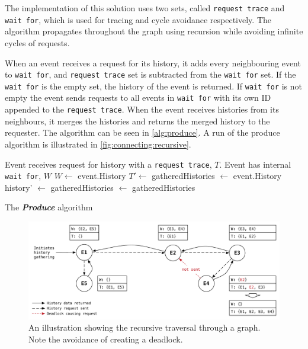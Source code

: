 	\newpar The implementation of this solution uses two sets, called \texttt{request trace} and \texttt{wait for}, which is used for tracing and cycle avoidance respectively. The algorithm propagates throughout the graph using recursion while avoiding infinite cycles of requests. 
	
	When an event receives a request for its history, it adds every neighbouring event to \texttt{wait for}, and \texttt{request trace} set is subtracted from the \texttt{wait for} set. If the \texttt{wait for} is the empty set, the history of the event is returned. If \texttt{wait for} is not empty the event sends requests to all events in \texttt{wait for} with its own ID appended to the \texttt{request trace}. When the event receives histories from its neighbours, it merges the histories and returns the merged history to the requester. The algorithm can be seen in \autoref{alg:produce}. A run of the produce algorithm is illustrated in \autoref{fig:connecting:recursive}.
	
	\begin{algorithm}
		\begin{algorithmic}
			\State Event receives request for history with a \texttt{request trace}, $T$.
			\State Event has internal \texttt{wait for}, $W$
			\State
				\State $W\gets$ 
					\Return event.History
				\Else
					\State $T'\gets$
					\State
					\State gatheredHistories $\leftarrow$ event.History
						\State history' $\leftarrow$ 
						\State gatheredHistories $\leftarrow$ 
					\EndFor
					\State\Return gatheredHistories
				\EndIf
			\EndFunction
		\end{algorithmic}
		\caption{The \textit{\textbf{Produce}} algorithm}
		\label{alg:produce}
	\end{algorithm}
		
	\begin{figure}[H]
		\centering
		\includegraphics[width=\textwidth]{4connect/images/recursive.pdf}
		\caption{An illustration showing the recursive traversal through a graph. Note the avoidance of creating a deadlock.}
		\label{fig:connecting:recursive}
	\end{figure}
		
